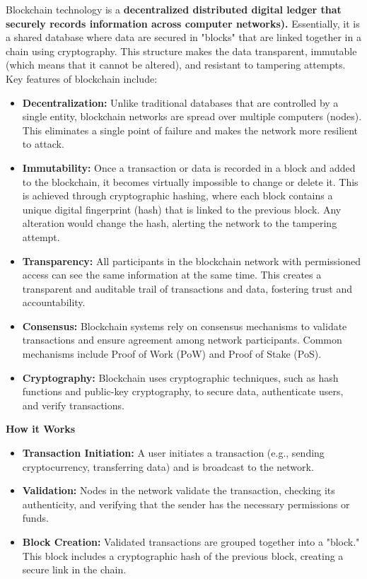  Blockchain technology is a \textbf{decentralized distributed digital ledger that securely records information across computer networks).} Essentially, it is a shared database where data are secured in "blocks" that are linked together in a chain using cryptography. This structure makes the data transparent, immutable (which means that it cannot be altered), and resistant to tampering attempts. Key features of blockchain include:
\begin{itemize}
    \item \textbf{Decentralization:} Unlike traditional databases that are controlled by a single entity, blockchain networks are spread over multiple computers (nodes). This eliminates a single point of failure and makes the network more resilient to attack.
    \item \textbf{Immutability:} Once a transaction or data is recorded in a block and added to the blockchain, it becomes virtually impossible to change or delete it. This is achieved through cryptographic hashing, where each block contains a unique digital fingerprint (hash) that is linked to the previous block. Any alteration would change the hash, alerting the network to the tampering attempt.
    \item \textbf{Transparency:} All participants in the blockchain network with permissioned access can see the same information at the same time. This creates a transparent and auditable trail of transactions and data, fostering trust and accountability.
    \item \textbf{Consensus:} Blockchain systems rely on consensus mechanisms to validate transactions and ensure agreement among network participants. Common mechanisms include Proof of Work (PoW) and Proof of Stake (PoS).
    \item \textbf{Cryptography:} Blockchain uses cryptographic techniques, such as hash functions and public-key cryptography, to secure data, authenticate users, and verify transactions.
\end{itemize}
\textbf{How it Works}
\begin{itemize}
    \item \textbf{Transaction Initiation:} A user initiates a transaction (e.g., sending cryptocurrency, transferring data) and is broadcast to the network.
    \item \textbf{Validation:} Nodes in the network validate the transaction, checking its authenticity, and verifying that the sender has the necessary permissions or funds.
    \item \textbf{Block Creation:} Validated transactions are grouped together into a "block." This block includes a cryptographic hash of the previous block, creating a secure link in the chain.
\end{itemize}

